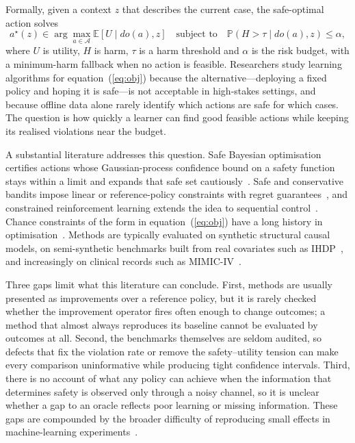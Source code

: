 \documentclass[10pt,a4paper]{article}
\begin{document}
Formally, given a context $z$ that describes the current case, the safe-optimal action solves
\begin{equation}
a^\star(z)\in\arg\max_{a\in\mathcal A}\mathbb E[U\mid do(a),z]\quad\text{subject to}\quad
\mathbb P(H>\tau\mid do(a),z)\le\alpha, \label{eq:obj}
\end{equation}
where $U$ is utility, $H$ is harm, $\tau$ is a harm threshold and $\alpha$ is the risk budget, with a
minimum-harm fallback when no action is feasible. Researchers study learning algorithms for
equation~(\ref{eq:obj}) because the alternative---deploying a fixed policy and hoping it is safe---is
not acceptable in high-stakes settings, and because offline data alone rarely identify which
actions are safe for which cases. The question is how quickly a learner can find good feasible
actions while keeping its realised violations near the budget.

A substantial literature addresses this question. Safe Bayesian optimisation certifies actions
whose Gaussian-process confidence bound on a safety function stays within a limit and expands that
safe set cautiously~\cite{sui2015safeopt,sui2018stageopt,berkenkamp2023}. Safe and conservative
bandits impose linear or reference-policy constraints with regret
guarantees~\cite{wu2016conservative,kazerouni2017conservative,amani2019linear,pacchiano2021}, and
constrained reinforcement learning extends the idea to sequential
control~\cite{altman1999cmdp,achiam2017cpo,garcia2015survey}. Chance constraints of the form in
equation~(\ref{eq:obj}) have a long history in optimisation~\cite{charnes1959}. Methods are typically
evaluated on synthetic structural causal models, on semi-synthetic benchmarks built from real
covariates such as IHDP~\cite{hill2011,shalit2017,dorie2019}, and increasingly on clinical records
such as MIMIC-IV~\cite{johnson2023mimic,komorowski2018}.

Three gaps limit what this literature can conclude. First, methods are usually presented as
improvements over a reference policy, but it is rarely checked whether the improvement operator
fires often enough to change outcomes; a method that almost always reproduces its baseline cannot
be evaluated by outcomes at all. Second, the benchmarks themselves are seldom audited, so defects
that fix the violation rate or remove the safety--utility tension can make every comparison
uninformative while producing tight confidence intervals. Third, there is no account of what any
policy can achieve when the information that determines safety is observed only through a noisy
channel, so it is unclear whether a gap to an oracle reflects poor learning or missing information.
These gaps are compounded by the broader difficulty of reproducing small effects in machine-learning
experiments~\cite{henderson2018,pineau2021,gundersen2018}.
\end{document}
